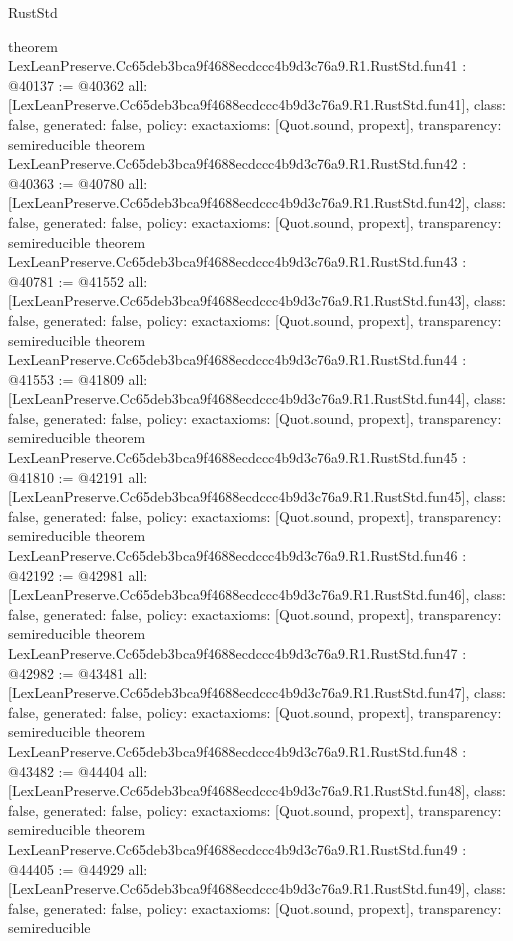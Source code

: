 \begin{lexlean}{RustStd}
\begin{coremodule}
{}
theorem LexLeanPreserve.Cc65deb3bca9f4688ecdccc4b9d3c76a9.R1.RustStd.fun41 : @40137 := @40362 {
  all: [LexLeanPreserve.Cc65deb3bca9f4688ecdccc4b9d3c76a9.R1.RustStd.fun41],
  class: false,
  generated: false,
  policy: exact{axioms: [Quot.sound, propext]},
  transparency: semireducible
}
theorem LexLeanPreserve.Cc65deb3bca9f4688ecdccc4b9d3c76a9.R1.RustStd.fun42 : @40363 := @40780 {
  all: [LexLeanPreserve.Cc65deb3bca9f4688ecdccc4b9d3c76a9.R1.RustStd.fun42],
  class: false,
  generated: false,
  policy: exact{axioms: [Quot.sound, propext]},
  transparency: semireducible
}
theorem LexLeanPreserve.Cc65deb3bca9f4688ecdccc4b9d3c76a9.R1.RustStd.fun43 : @40781 := @41552 {
  all: [LexLeanPreserve.Cc65deb3bca9f4688ecdccc4b9d3c76a9.R1.RustStd.fun43],
  class: false,
  generated: false,
  policy: exact{axioms: [Quot.sound, propext]},
  transparency: semireducible
}
theorem LexLeanPreserve.Cc65deb3bca9f4688ecdccc4b9d3c76a9.R1.RustStd.fun44 : @41553 := @41809 {
  all: [LexLeanPreserve.Cc65deb3bca9f4688ecdccc4b9d3c76a9.R1.RustStd.fun44],
  class: false,
  generated: false,
  policy: exact{axioms: [Quot.sound, propext]},
  transparency: semireducible
}
theorem LexLeanPreserve.Cc65deb3bca9f4688ecdccc4b9d3c76a9.R1.RustStd.fun45 : @41810 := @42191 {
  all: [LexLeanPreserve.Cc65deb3bca9f4688ecdccc4b9d3c76a9.R1.RustStd.fun45],
  class: false,
  generated: false,
  policy: exact{axioms: [Quot.sound, propext]},
  transparency: semireducible
}
theorem LexLeanPreserve.Cc65deb3bca9f4688ecdccc4b9d3c76a9.R1.RustStd.fun46 : @42192 := @42981 {
  all: [LexLeanPreserve.Cc65deb3bca9f4688ecdccc4b9d3c76a9.R1.RustStd.fun46],
  class: false,
  generated: false,
  policy: exact{axioms: [Quot.sound, propext]},
  transparency: semireducible
}
theorem LexLeanPreserve.Cc65deb3bca9f4688ecdccc4b9d3c76a9.R1.RustStd.fun47 : @42982 := @43481 {
  all: [LexLeanPreserve.Cc65deb3bca9f4688ecdccc4b9d3c76a9.R1.RustStd.fun47],
  class: false,
  generated: false,
  policy: exact{axioms: [Quot.sound, propext]},
  transparency: semireducible
}
theorem LexLeanPreserve.Cc65deb3bca9f4688ecdccc4b9d3c76a9.R1.RustStd.fun48 : @43482 := @44404 {
  all: [LexLeanPreserve.Cc65deb3bca9f4688ecdccc4b9d3c76a9.R1.RustStd.fun48],
  class: false,
  generated: false,
  policy: exact{axioms: [Quot.sound, propext]},
  transparency: semireducible
}
theorem LexLeanPreserve.Cc65deb3bca9f4688ecdccc4b9d3c76a9.R1.RustStd.fun49 : @44405 := @44929 {
  all: [LexLeanPreserve.Cc65deb3bca9f4688ecdccc4b9d3c76a9.R1.RustStd.fun49],
  class: false,
  generated: false,
  policy: exact{axioms: [Quot.sound, propext]},
  transparency: semireducible
}
\end{coremodule}
\end{lexlean}
